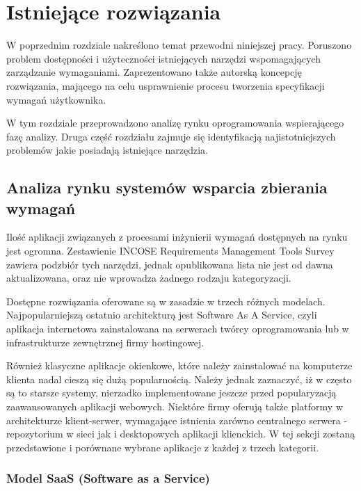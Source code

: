 \chapter{Istniejące rozwiązania}

  W poprzednim rozdziale nakreślono temat przewodni niniejszej pracy. Poru\-szono problem dostępności i użyteczności istniejących narzędzi wspomagających zarządzanie wymaganiami. Zaprezentowano także autorską koncepcję rozwiązania, mającego na celu usprawnienie procesu tworzenia specyfikacji wymagań użytkownika. 
  
  W tym rozdziale przeprowadzono analizę rynku oprogramowania wspierającego fazę analizy. Druga część rozdziału zajmuje się identyfikacją najistotniejszych problemów jakie posiadają istniejące narzędzia. 

  \section{Analiza rynku systemów wsparcia zbierania wymagań}

    Ilość aplikacji związanych z procesami inżynierii wymagań dostępnych na rynku jest ogromna. Zestawienie INCOSE Requirements Management Tools Survey \cite{Incose} zawiera podzbiór tych narzędzi, jednak opublikowana lista nie jest od dawna aktualizowana, oraz nie wprowadza żadnego rodzaju kategoryzacji. 

    Dostępne rozwiązania oferowane są w zasadzie w trzech różnych modelach. Najpopularniejszą ostatnio architekturą jest Software As A Service, czyli aplikacja internetowa zainstalowana na serwerach twórcy oprogramowania lub w infrastrukturze zewnętrznej firmy hostingowej. 
    
    Również klasyczne aplikacje okienkowe, które należy zainstalować na komputerze klienta nadal cieszą się dużą popularnością. Należy jednak zaznaczyć, iż w często są to starsze systemy, nierzadko implementowane jeszcze przed popularyzacją zaawansowanych aplikacji webowych. Niektóre firmy oferują także platformy w architekturze klient-serwer, wymagające istnienia zarówno centralnego serwera - repozytorium w sieci jak i desktopowych aplikacji klienckich. W tej sekcji zostaną przedstawione i porównane wybrane aplikacje z każdej z trzech kategorii. 

    \subsection{Model SaaS (Software as a Service)}

